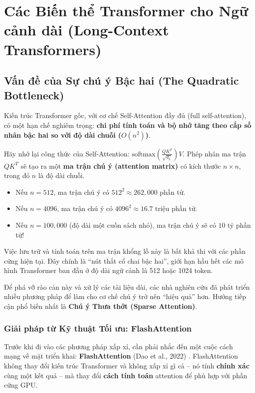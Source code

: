 
\section{Các Biến thể Transformer cho Ngữ cảnh dài (Long-Context Transformers)}
\label{sec:long_context_transformers}

\subsection{Vấn đề của Sự chú ý Bậc hai (The Quadratic Bottleneck)}
\label{ssec:quadratic_bottleneck}

Kiến trúc Transformer gốc, với cơ chế Self-Attention đầy đủ (full self-attention), có một hạn chế nghiêm trọng: \textbf{chi phí tính toán và bộ nhớ tăng theo cấp số nhân bậc hai so với độ dài chuỗi ($O(n^2)$)}.

Hãy nhớ lại công thức của Self-Attention: $\text{softmax}\left(\frac{QK^T}{\sqrt{d_k}}\right)V$. Phép nhân ma trận $QK^T$ sẽ tạo ra một \textbf{ma trận chú ý (attention matrix)} có kích thước $n \times n$, trong đó $n$ là độ dài chuỗi.
\begin{itemize}
    \item Nếu $n = 512$, ma trận chú ý có $512^2 \approx 262,000$ phần tử.
    \item Nếu $n = 4096$, ma trận chú ý có $4096^2 \approx 16.7$ triệu phần tử.
    \item Nếu $n = 100,000$ (độ dài một cuốn sách nhỏ), ma trận chú ý sẽ có $10$ tỷ phần tử!
\end{itemize}
Việc lưu trữ và tính toán trên ma trận khổng lồ này là bất khả thi với các phần cứng hiện tại. Đây chính là “nút thắt cổ chai bậc hai”, giới hạn hầu hết các mô hình Transformer ban đầu ở độ dài ngữ cảnh là 512 hoặc 1024 token.

Để phá vỡ rào cản này và xử lý các tài liệu dài, các nhà nghiên cứu đã phát triển nhiều phương pháp để làm cho cơ chế chú ý trở nên “hiệu quả” hơn. Hướng tiếp cận phổ biến nhất là \textbf{Chú ý Thưa thớt (Sparse Attention)}.
\subsubsection{Giải pháp từ Kỹ thuật Tối ưu: FlashAttention \newtag}
\label{sssec:flashattention}
Trước khi đi vào các phương pháp xấp xỉ, cần phải nhắc đến một cuộc cách mạng về mặt triển khai: \textbf{FlashAttention} (Dao et al., 2022) \cite{dao2022flashattention}. FlashAttention không thay đổi kiến trúc Transformer và không xấp xỉ gì cả -- nó tính \textbf{chính xác} cùng một kết quả -- mà thay đổi \textbf{cách tính toán} attention để phù hợp với phần cứng GPU.

